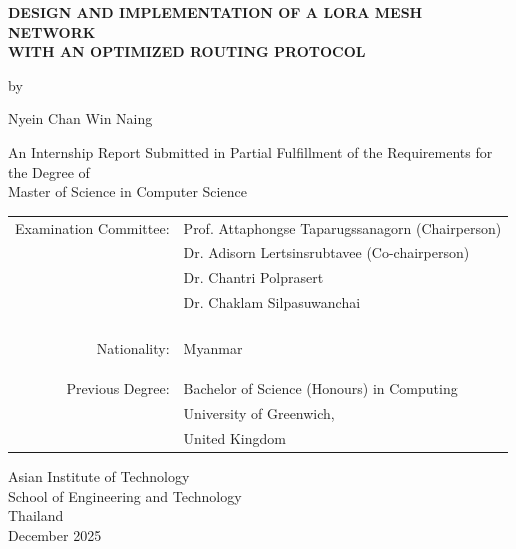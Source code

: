 \begin{titlepage}
  \begin{center}

  \textbf{\large{
  DESIGN AND IMPLEMENTATION OF A LORA MESH NETWORK \\ WITH AN OPTIMIZED ROUTING PROTOCOL
  }}

  \vspace{3em} %

  by

  \vspace{3em} %

  Nyein Chan Win Naing

  \vspace{4em} %

  An Internship Report Submitted in Partial Fulfillment of the Requirements for the Degree of \\ Master of Science in Computer Science

  \vspace{4em} %

\begin{center}
  \begin{tabular}{ rl }
Examination Committee: & Prof. Attaphongse Taparugssanagorn (Chairperson) \\
                       & Dr. Adisorn Lertsinsrubtavee (Co-chairperson) \\
                       & Dr. Chantri Polprasert \\
                       & Dr. Chaklam Silpasuwanchai \\\\
\\ \\ \\
Nationality:     & Myanmar \\
\\ \\ \\
Previous Degree: & Bachelor of Science (Honours) in Computing \\
                 & University of Greenwich, \\
                 & United Kingdom \\
  \end{tabular}
\end{center}

\vspace{4em}

Asian Institute of Technology \\
School of Engineering and Technology \\
Thailand \\
December 2025


  \end{center}
\end{titlepage}
